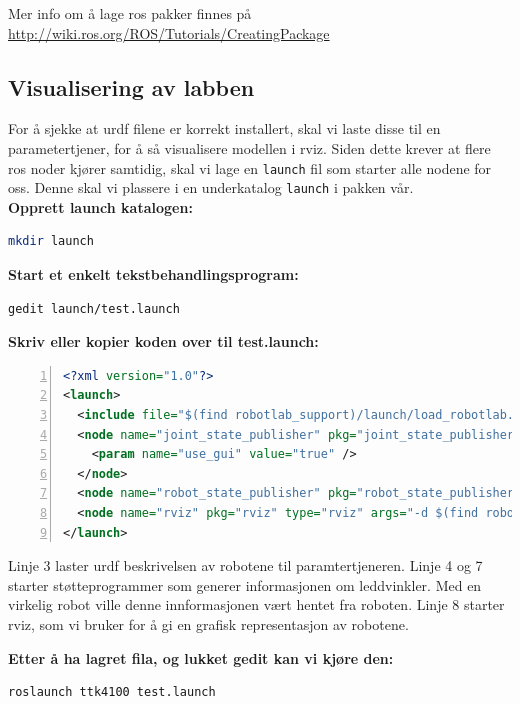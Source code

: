 \documentclass{article}
\begin{document}
Mer info om å lage \gls{ros} pakker finnes på \url{http://wiki.ros.org/ROS/Tutorials/CreatingPackage}

\subsection{Visualisering av labben}
For å sjekke at \gls{urdf} filene er korrekt installert, skal vi laste disse til en parametertjener, for å så visualisere modellen i rviz. Siden dette krever at flere \gls{ros} noder kjører samtidig, skal vi lage en \texttt{launch} fil som starter alle nodene for oss. Denne skal vi plassere i en underkatalog \texttt{launch} i pakken vår. \\


\noindent\textbf{Opprett launch katalogen:}
\begin{lstlisting}[language=bash]
mkdir launch
\end{lstlisting}
 
\noindent\textbf{Start et enkelt tekstbehandlingsprogram:}
\begin{lstlisting}[language=bash]
gedit launch/test.launch
\end{lstlisting}
 
 \noindent\textbf{Skriv eller kopier koden over til test.launch:}
\begin{lstlisting}[language=xml,numbers=left,stepnumber=1]
<?xml version="1.0"?>
<launch>
  <include file="$(find robotlab_support)/launch/load_robotlab.launch" />
  <node name="joint_state_publisher" pkg="joint_state_publisher" type="joint_state_publisher">
    <param name="use_gui" value="true" />
  </node>
  <node name="robot_state_publisher" pkg="robot_state_publisher" type="robot_state_publisher"/>
  <node name="rviz" pkg="rviz" type="rviz" args="-d $(find robotlab_support)/config/rviz.rviz" required="true" />
</launch>
\end{lstlisting}

Linje 3 laster \gls{urdf} beskrivelsen av robotene til paramtertjeneren. Linje 4 og 7 starter støtteprogrammer som generer informasjonen om leddvinkler. Med en virkelig robot ville denne innformasjonen vært hentet fra roboten. Linje 8 starter rviz, som vi bruker for å gi en grafisk representasjon av robotene.

\noindent\textbf{Etter å ha lagret fila, og lukket gedit kan vi kjøre den:}
\begin{lstlisting}[language=bash]
roslaunch ttk4100 test.launch
\end{lstlisting}
\end{document}
